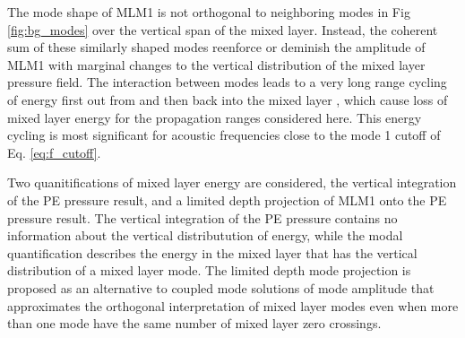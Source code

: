 \documentclass[preprint,NumberedRefs]{JASA}
\begin{document}
The mode shape of MLM1 is not orthogonal to neighboring modes in Fig \ref{fig:bg_modes} over the vertical span of the mixed layer. Instead, the coherent sum of these similarly shaped modes reenforce or deminish the amplitude of MLM1 with marginal changes to the vertical distribution of the mixed layer pressure field. The interaction between modes leads to a very long range cycling of energy first out from and then back into the mixed layer \citep{porter93}, which cause loss of mixed layer energy for the propagation ranges considered here. This energy cycling is most significant for acoustic frequencies close to the mode 1 cutoff of Eq. \eqref{eq:f_cutoff}.


Two quanitifications of mixed layer energy are considered, the vertical integration of the PE pressure result, and a limited depth projection of MLM1 onto the PE pressure result. The vertical integration of the PE pressure contains no information about the vertical distributution of energy, while the modal quantification describes the energy in the mixed layer that has the vertical distribution of a mixed layer mode. The limited depth mode projection is proposed as an alternative to coupled mode solutions of mode amplitude that approximates the orthogonal interpretation of mixed layer modes even when more than one mode have the same number of mixed layer zero crossings.
\end{document}
